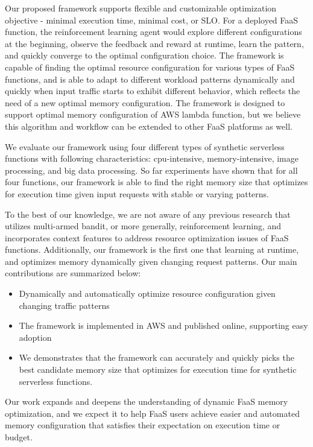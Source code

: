 \documentclass[conference]{IEEEtran}
\begin{document}
Our proposed framework supports flexible and customizable optimization objective - minimal execution time, minimal cost, or SLO. For a deployed FaaS function, the reinforcement learning agent would explore different configurations at the beginning, observe the feedback and reward at runtime, learn the pattern, and quickly converge to the optimal configuration choice. The framework is capable of finding the optimal resource configuration for various types of FaaS functions, and is able to adapt to different workload patterns dynamically and quickly when input traffic starts to exhibit different behavior, which reflects the need of a new optimal memory configuration. The framework is designed to support optimal memory configuration of AWS lambda function, but we believe this algorithm and workflow can be extended to other FaaS platforms as well.

We evaluate our framework using four different types of synthetic serverless functions with following characteristics: cpu-intensive, memory-intensive, image processing, and big data processing. So far experiments have shown that for all four functions, our framework is able to find the right memory size that optimizes for execution time given input requests with stable or varying patterns.

To the best of our knowledge, we are not aware of any previous research that utilizes multi-armed bandit, or more generally, reinforcement learning, and incorporates context features to address resource optimization issues of FaaS functions. Additionally, our framework is the first one that learning at runtime, and optimizes memory dynamically given changing request patterns. Our main contributions are summarized below:

\begin{itemize}
    \item Dynamically and automatically optimize resource configuration given changing traffic patterns
    \item The framework is implemented in AWS and published online, supporting easy adoption
    \item We demonstrates that the framework can accurately and quickly picks the best candidate memory size that optimizes for execution time for synthetic serverless functions.
\end{itemize}

Our work expands and deepens the understanding of dynamic FaaS memory optimization, and we expect it to help FaaS users achieve easier and automated memory configuration that satisfies their expectation on execution time or budget.
\end{document}
